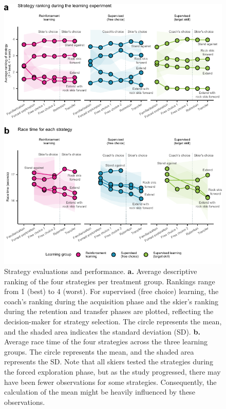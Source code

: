 \documentclass[pdflatex,sn-nature]{sn-jnl}%
\theoremstyle{thmstyleone}%
\theoremstyle{thmstyletwo}%
\theoremstyle{thmstylethree}%
\begin{document}
\begin{figure}[H]
\centering
\includegraphics[]{figures/figure_ranking_average_3.pdf}
\caption{Strategy evaluations and performance. \textbf{a. }Average descriptive ranking of the four strategies per treatment group. Rankings range from 1 (best) to 4 (worst). For supervised (free choice) learning, the coach's ranking during the acquisition phase and the skier's ranking during the retention and transfer phases are plotted, reflecting the decision-maker for strategy selection. The circle represents the mean, and the shaded area indicates the standard deviation (SD). \textbf{b.} Average race time of the four strategies across the three learning groups. The circle represents the mean, and the shaded area represents the SD. Note that all skiers tested the strategies during the forced exploration phase, but as the study progressed, there may have been fewer observations for some strategies. Consequently, the calculation of the mean might be heavily influenced by these observations.}\label{fig: rank}
\end{figure}
\end{document}
